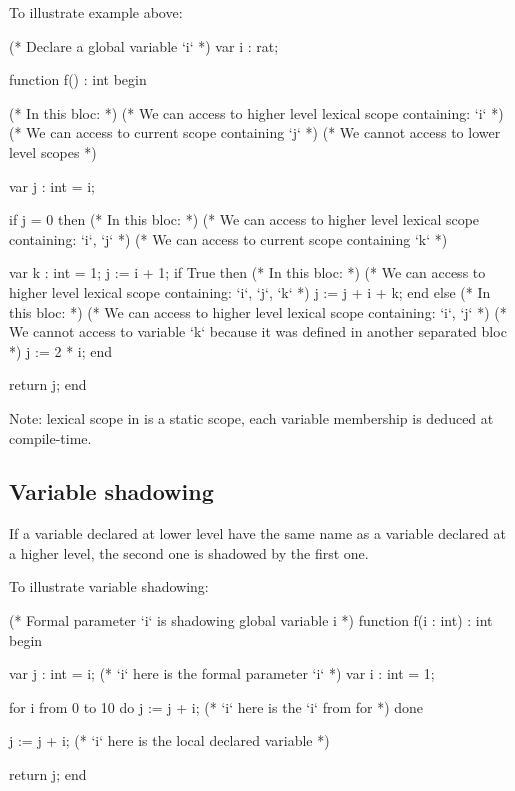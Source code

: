 \begin{example}
	To illustrate example above:

\begin{IMITATORmodel}
(* Declare a global variable `i` *)
var i : rat;

function f() : int
begin

	(* In this bloc: *)
	(* We can access to higher level lexical scope containing: `i` *)
	(* We can access to current scope containing `j` *)
	(* We cannot access to lower level scopes *)

	var j : int = i;

	if j = 0 then
		(* In this bloc: *)
		(* We can access to higher level lexical scope containing: `i`, `j` *)
		(* We can access to current scope containing `k` *)

		var k : int = 1;
		j := i + 1;
		if True then
			(* In this bloc: *)
			(* We can access to higher level lexical scope containing: `i`, `j`, `k` *)
			j := j + i + k;
		end
	else
		(* In this bloc: *)
		(* We can access to higher level lexical scope containing: `i`, `j` *)
		(* We cannot access to variable `k` because it was defined in another separated bloc *)
		j := 2 * i;
	end

	return j;
end
\end{IMITATORmodel}
\end{example}

Note: lexical scope in \imitator{} is a static scope, each variable membership is deduced at compile-time.

\subsection{Variable shadowing}

If a variable declared at lower level have the same name as a variable declared at a higher level, the second one is shadowed by the first one.

\begin{example}
	To illustrate variable shadowing:

\begin{IMITATORmodel}
(* Formal parameter `i` is shadowing global variable i *)
function f(i : int) : int
begin

	var j : int = i; (* `i` here is the formal parameter `i` *)
	var i : int = 1;

	for i from 0 to 10 do
		j := j + i; (* `i` here is the `i` from for *)
	done

	j := j + i; (* `i` here is the local declared variable *)

	return j;
end
\end{IMITATORmodel}
\end{example}

